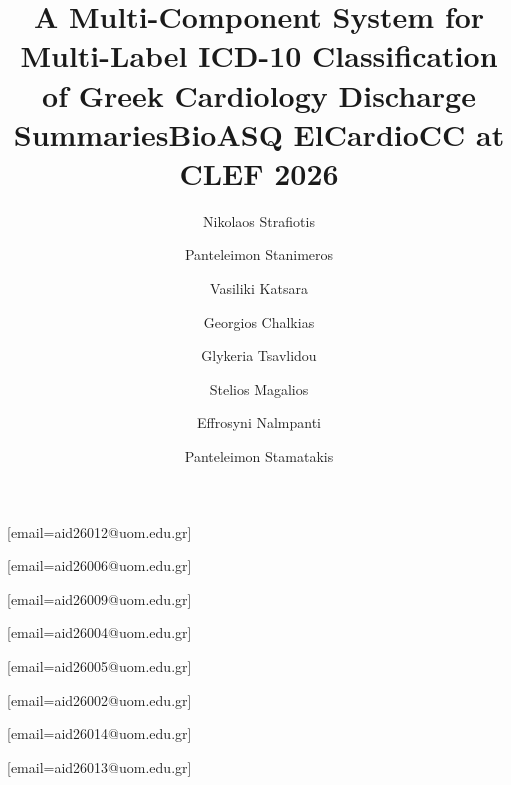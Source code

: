 \documentclass{ceurart}
\begin{document}
\makeatletter
\renewcommand{\@copyrightLine}{%
  \begin{minipage}[c]{\ccLogoWidth}
    \doclicenseImage[imagewidth=\ccLogoWidth]
  \end{minipage}
  \nobreak\enskip
  \begin{minipage}[c]{\linewidth - \ccLogoWidth - 2\footnotemargin}
    \tiny
    \@copyrightclause
  \end{minipage}
}
\makeatother


\title{A Multi-Component System for Multi-Label ICD-10 Classification of Greek Cardiology Discharge Summaries}
\title[mode=sub]{BioASQ ElCardioCC at CLEF 2026}

\author[1]{Nikolaos Strafiotis}[email=aid26012@uom.edu.gr]
\author[1]{Panteleimon Stanimeros}[email=aid26006@uom.edu.gr]
\author[1]{Vasiliki Katsara}[email=aid26009@uom.edu.gr]
\author[1]{Georgios Chalkias}[email=aid26004@uom.edu.gr]
\author[1]{Glykeria Tsavlidou}[email=aid26005@uom.edu.gr]
\author[1]{Stelios Magalios}[email=aid26002@uom.edu.gr]
\author[1]{Effrosyni Nalmpanti}[email=aid26014@uom.edu.gr]
\author[1]{Panteleimon Stamatakis}[email=aid26013@uom.edu.gr]

\address[1]{MSc in Artificial Intelligence \& Data Analytics\\
  Department of Applied Informatics, University of Macedonia,
  Thessaloniki, Greece}


\end{document}
